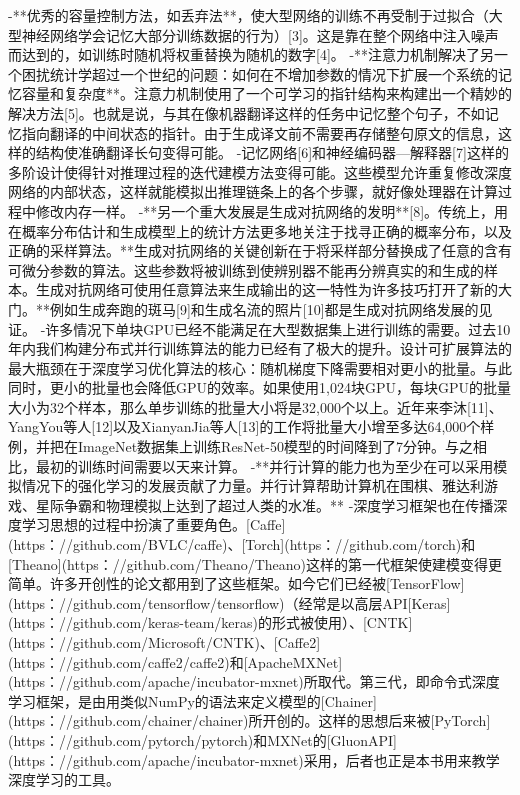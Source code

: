 -**优秀的容量控制方法，如丢弃法**，使大型网络的训练不再受制于过拟合（大型神经网络学会记忆大部分训练数据的行为）[3]。这是靠在整个网络中注入噪声而达到的，如训练时随机将权重替换为随机的数字[4]。
-**注意力机制解决了另一个困扰统计学超过一个世纪的问题：如何在不增加参数的情况下扩展一个系统的记忆容量和复杂度**。注意力机制使用了一个可学习的指针结构来构建出一个精妙的解决方法[5]。也就是说，与其在像机器翻译这样的任务中记忆整个句子，不如记忆指向翻译的中间状态的指针。由于生成译文前不需要再存储整句原文的信息，这样的结构使准确翻译长句变得可能。
-记忆网络[6]和神经编码器—解释器[7]这样的多阶设计使得针对推理过程的迭代建模方法变得可能。这些模型允许重复修改深度网络的内部状态，这样就能模拟出推理链条上的各个步骤，就好像处理器在计算过程中修改内存一样。
-**另一个重大发展是生成对抗网络的发明**[8]。传统上，用在概率分布估计和生成模型上的统计方法更多地关注于找寻正确的概率分布，以及正确的采样算法。**生成对抗网络的关键创新在于将采样部分替换成了任意的含有可微分参数的算法。这些参数将被训练到使辨别器不能再分辨真实的和生成的样本。生成对抗网络可使用任意算法来生成输出的这一特性为许多技巧打开了新的大门。**例如生成奔跑的斑马[9]和生成名流的照片[10]都是生成对抗网络发展的见证。
-许多情况下单块GPU已经不能满足在大型数据集上进行训练的需要。过去10年内我们构建分布式并行训练算法的能力已经有了极大的提升。设计可扩展算法的最大瓶颈在于深度学习优化算法的核心：随机梯度下降需要相对更小的批量。与此同时，更小的批量也会降低GPU的效率。如果使用1,024块GPU，每块GPU的批量大小为32个样本，那么单步训练的批量大小将是32,000个以上。近年来李沐[11]、YangYou等人[12]以及XianyanJia等人[13]的工作将批量大小增至多达64,000个样例，并把在ImageNet数据集上训练ResNet-50模型的时间降到了7分钟。与之相比，最初的训练时间需要以天来计算。
-**并行计算的能力也为至少在可以采用模拟情况下的强化学习的发展贡献了力量。并行计算帮助计算机在围棋、雅达利游戏、星际争霸和物理模拟上达到了超过人类的水准。**
-深度学习框架也在传播深度学习思想的过程中扮演了重要角色。[Caffe](https：//github.com/BVLC/caffe)、[Torch](https：//github.com/torch)和[Theano](https：//github.com/Theano/Theano)这样的第一代框架使建模变得更简单。许多开创性的论文都用到了这些框架。如今它们已经被[TensorFlow](https：//github.com/tensorflow/tensorflow)（经常是以高层API[Keras](https：//github.com/keras-team/keras)的形式被使用）、[CNTK](https：//github.com/Microsoft/CNTK)、[Caffe2](https：//github.com/caffe2/caffe2)和[ApacheMXNet](https：//github.com/apache/incubator-mxnet)所取代。第三代，即命令式深度学习框架，是由用类似NumPy的语法来定义模型的[Chainer](https：//github.com/chainer/chainer)所开创的。这样的思想后来被[PyTorch](https：//github.com/pytorch/pytorch)和MXNet的[GluonAPI](https：//github.com/apache/incubator-mxnet)采用，后者也正是本书用来教学深度学习的工具。

